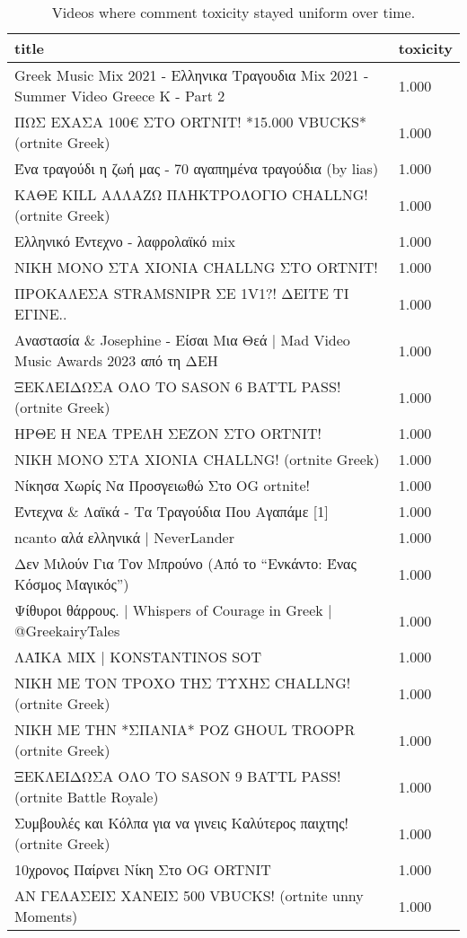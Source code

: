 \begin{table}
\caption{Videos where comment toxicity stayed uniform over time.}
\label{tab::toxic_uniform}
\begin{tabular}{|p{10cm}|p{1cm}|}
\toprule
title & toxicity \\
\midrule
Greek Music Mix 2021 - Ελληνικα Τραγουδια Mix 2021 - Summer Video Greece K - Part 2 & 1.000 \\
ΠΩΣ ΕΧΑΣΑ 100€ ΣΤΟ ORTNIT! *15.000 VBUCKS* (ortnite Greek) & 1.000 \\
Ένα τραγούδι η ζωή μας - 70 αγαπημένα τραγούδια (by lias) & 1.000 \\
ΚΑΘΕ KILL ΑΛΛΑΖΩ ΠΛΗΚΤΡΟΛΟΓΙΟ CHALLNG! (ortnite Greek) & 1.000 \\
Ελληνικό Έντεχνο - λαφρολαϊκό mix & 1.000 \\
ΝΙΚΗ ΜΟΝΟ ΣΤΑ ΧΙΟΝΙΑ CHALLNG ΣΤΟ ORTNIT! & 1.000 \\
ΠΡΟΚΑΛΕΣΑ STRAMSNIPR ΣΕ 1V1?! ΔΕΙΤΕ ΤΙ ΕΓΙΝΕ.. & 1.000 \\
Αναστασία \& Josephine - Είσαι Μια Θεά | Mad Video Music Awards 2023 από τη ΔΕΗ & 1.000 \\
ΞΕΚΛΕΙΔΩΣΑ ΟΛΟ ΤΟ SASON 6 BATTL PASS! (ortnite Greek) & 1.000 \\
ΗΡΘΕ Η ΝΕΑ ΤΡΕΛΗ ΣΕΖΟΝ ΣΤΟ ORTNIT! & 1.000 \\
ΝΙΚΗ ΜΟΝΟ ΣΤΑ ΧΙΟΝΙΑ CHALLNG! (ortnite Greek) & 1.000 \\
Νίκησα Χωρίς Να Προσγειωθώ Στο ΟG ortnite! & 1.000 \\
Έντεχνα \& Λαϊκά - Τα Τραγούδια Που Αγαπάμε [1] & 1.000 \\
ncanto αλά ελληνικά | NeverLander & 1.000 \\
Δεν Μιλούν Για Τον Μπρούνο (Από το “Ενκάντο: Ένας Κόσμος Μαγικός”) & 1.000 \\
Ψίθυροι θάρρους. | Whispers of Courage in Greek | @GreekairyTales & 1.000 \\
ΛΑΪΚΑ MIX | KONSTANTINOS SOT & 1.000 \\
ΝΙΚΗ ΜΕ ΤΟΝ ΤΡΟΧΟ ΤΗΣ ΤΥΧΗΣ CHALLNG! (ortnite Greek) & 1.000 \\
ΝΙΚΗ ΜΕ ΤΗΝ *ΣΠΑΝΙΑ* ΡΟΖ GHOUL TROOPR (ortnite Greek) & 1.000 \\
ΞΕΚΛΕΙΔΩΣΑ ΟΛΟ ΤΟ SASON 9 BATTL PASS! (ortnite Battle Royale) & 1.000 \\
Συμβουλές και Κόλπα για να γινεις Καλύτερος παιχτης! (ortnite Greek) & 1.000 \\
10χρονος Παίρνει Νίκη Στο OG ORTNIT & 1.000 \\
ΑΝ ΓΕΛΑΣΕΙΣ ΧΑΝΕΙΣ 500 VBUCKS! (ortnite unny Moments) & 1.000 \\

\end{tabular}
\end{table}
